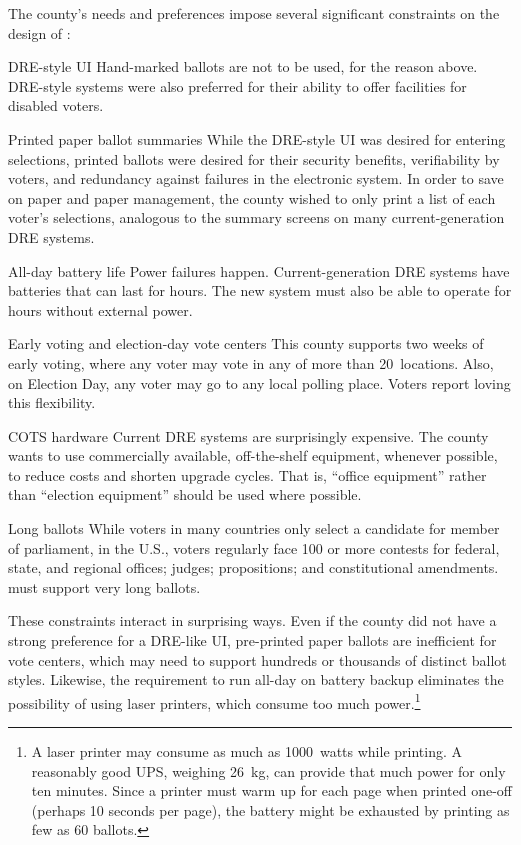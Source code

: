 The county's needs and preferences 
impose several significant constraints on the design of \projname:
\begin{compactdesc}
\item[DRE-style UI] 
    Hand-marked ballots are not to be used, for the reason above.
    DRE-style
    systems were also preferred for their ability to offer facilities for
    disabled voters.

\item[Printed paper ballot summaries]
    While the DRE-style UI was
    desired for entering selections, printed ballots were desired for their
    security benefits, verifiability by voters, and redundancy against failures in the
    electronic system. In order to save on paper and paper management, the county wished to
    only print a list of each voter's selections, analogous to the
    summary screens on many current-generation DRE systems.

\item[All-day battery life]
    Power failures happen. Current-generation DRE systems have
    batteries that can last for hours. The new system must also be
    able to operate for hours without external power.

\item[Early voting and election-day vote centers]
    This county supports two weeks of early voting, where any voter
    may vote in any of more than 20~locations. Also,
    on Election Day, any voter may go to any local polling
    place. Voters report loving this flexibility.

\item[COTS hardware]
    Current DRE systems are surprisingly expensive. The county wants
    to use commercially available, off-the-shelf equipment, whenever
    possible, to reduce costs and shorten upgrade cycles.
    That is, ``office equipment''  rather than ``election
    equipment'' should be used where possible.

\item[Long ballots]
    While voters in many countries only select a candidate for member
    of parliament, in the U.S., voters regularly face
    100 or more contests for federal, state, and regional
    offices; judges; propositions;
    and constitutional amendments. \projname must support very long
    ballots.
\end{compactdesc}

These constraints interact in surprising ways. 
Even if the county did not have a strong preference for a DRE-like UI, 
pre-printed paper
ballots are inefficient for vote centers, which may
need to support hundreds or thousands of distinct ballot
styles. Likewise, the requirement to run all-day on battery backup
eliminates the possibility of using laser printers, which consume too
much power.\footnote{%
   A laser printer may consume as much as 1000~watts
  while printing. A reasonably good UPS, weighing 26~kg, can provide
  that much power for only ten minutes. Since a printer must 
  warm up for each page when printed one-off (perhaps 10
  seconds per page), the battery might be exhausted by printing
  as few as 60 ballots.
 }


